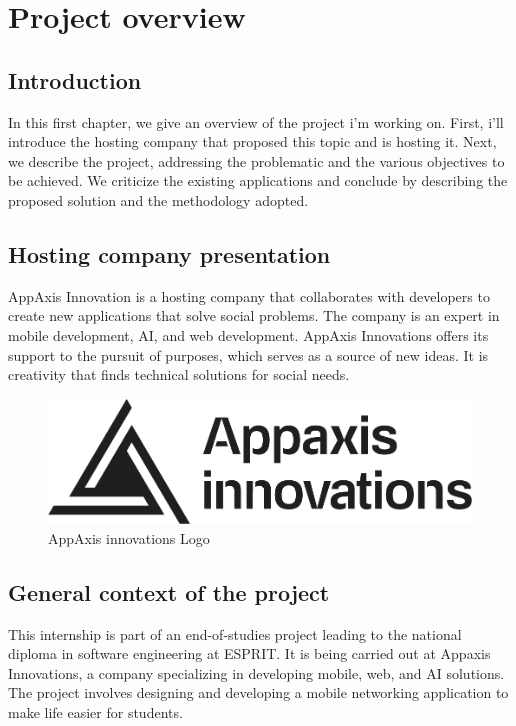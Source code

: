 \chapter{Project overview}


\section*{Introduction}
In this first chapter, we give an overview of the project i'm working on. First, i'll introduce the hosting company that proposed this topic and is hosting it. Next, we describe the project, addressing the problematic and the various objectives to be achieved. We criticize the existing applications and conclude by describing the proposed solution and the methodology adopted.


\section{Hosting company presentation}
AppAxis Innovation is a hosting company that collaborates with developers to create new applications that solve social problems. The company is an expert in mobile development, AI, and web development. AppAxis Innovations offers its support to the pursuit of purposes, which serves as a source of new ideas. It is creativity that finds technical solutions for social needs.
\begin{figure}[H] 
            \centering
            \includegraphics[scale=0.3]{logos/Full Logo Horizontal Stacked Black PNG.png}
            \caption{AppAxis innovations Logo} 
            \label{fig:Appaxis Logo}
\end{figure}

\section{General context of the project}
This internship is part of an end-of-studies project leading to the national diploma in software engineering at ESPRIT. It is being carried out at Appaxis Innovations, 
a company specializing in developing mobile, web, and AI solutions. The project involves designing and developing a mobile networking application to make life easier for students.

